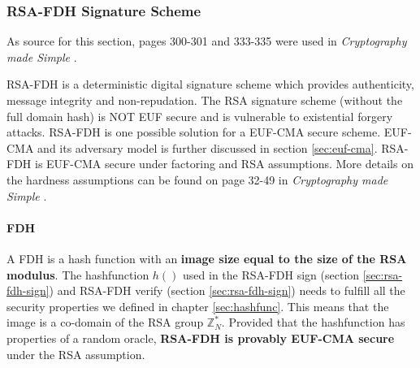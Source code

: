 \subsubsection{RSA-FDH Signature Scheme}
As source for this section, pages 300-301 and 333-335 were used in \textit{Cryptography made Simple} \cite{modernCrypto}.

\label{sec:rsa-fdh}
RSA-FDH is a deterministic digital signature scheme which provides authenticity, message integrity and non-repudation.
The RSA signature scheme (without the full domain hash) is NOT \ac{EUF} secure and is vulnerable to existential forgery attacks.
RSA-FDH is one possible solution for a EUF-CMA secure scheme. EUF-CMA and its adversary model is further discussed in section \ref{sec:euf-cma}.
RSA-FDH is EUF-CMA secure under factoring and RSA assumptions.
More details on the hardness assumptions can be found on page 32-49 in \textit{Cryptography made Simple} \cite{modernCrypto}.

\paragraph{\acl{FDH}}
A \acl{FDH} is a hash function with an \textbf{image size equal to the size of the RSA modulus}.
The hashfunction $h()$ used in the RSA-FDH sign (section \ref{sec:rsa-fdh-sign}) and RSA-FDH verify (section \ref{sec:rsa-fdh-sign}) needs to fulfill all the security properties we defined in chapter \ref{sec:hashfunc}.
This means that the image is a co-domain of the RSA group $\mathbb{Z}_N^*$.
Provided that the hashfunction has properties of a random oracle, \textbf{RSA-FDH is provably EUF-CMA secure} under the RSA assumption.

